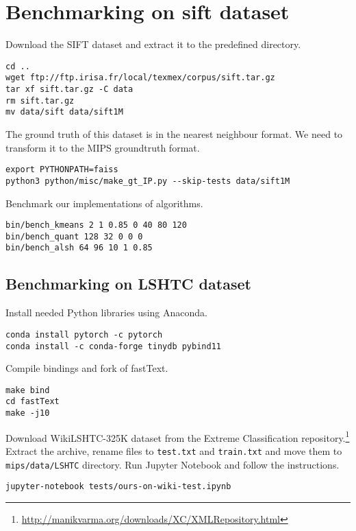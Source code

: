 \section{Benchmarking on sift dataset}
\noindent
Download the SIFT dataset and extract it to the predefined directory.
\begin{verbatim}
cd ..
wget ftp://ftp.irisa.fr/local/texmex/corpus/sift.tar.gz
tar xf sift.tar.gz -C data
rm sift.tar.gz
mv data/sift data/sift1M
\end{verbatim}
The ground truth of this dataset is in the nearest neighbour format.
We need to transform it to the MIPS groundtruth format.
\begin{verbatim}
export PYTHONPATH=faiss
python3 python/misc/make_gt_IP.py --skip-tests data/sift1M
\end{verbatim}
Benchmark our implementations of algorithms.
\begin{verbatim}
bin/bench_kmeans 2 1 0.85 0 40 80 120
bin/bench_quant 128 32 0 0 0
bin/bench_alsh 64 96 10 1 0.85
\end{verbatim}
\subsection{Benchmarking on LSHTC dataset}
\noindent
Install needed Python libraries using Anaconda.
\begin{verbatim}
conda install pytorch -c pytorch
conda install -c conda-forge tinydb pybind11
\end{verbatim}
Compile bindings and fork of fastText.
\begin{verbatim}
make bind
cd fastText
make -j10
\end{verbatim}
Download WikiLSHTC-325K dataset from the Extreme Classification repository.\footnote{ \url{http://manikvarma.org/downloads/XC/XMLRepository.html}}
Extract the archive, rename files to \texttt{test.txt} and \texttt{train.txt} and move them to \texttt{mips/data/LSHTC} directory.
Run Jupyter Notebook and follow the instructions.
\begin{verbatim}
jupyter-notebook tests/ours-on-wiki-test.ipynb 
\end{verbatim}
